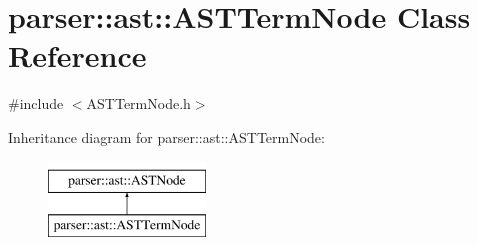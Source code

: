 \hypertarget{classparser_1_1ast_1_1ASTTermNode}{}\section{parser\+:\+:ast\+:\+:A\+S\+T\+Term\+Node Class Reference}
\label{classparser_1_1ast_1_1ASTTermNode}


{\ttfamily \#include $<$A\+S\+T\+Term\+Node.\+h$>$}

Inheritance diagram for parser\+:\+:ast\+:\+:A\+S\+T\+Term\+Node\+:\begin{figure}[H]
\begin{center}
\leavevmode
\includegraphics[height=2.000000cm]{de/d23/classparser_1_1ast_1_1ASTTermNode}
\end{center}
\end{figure}
